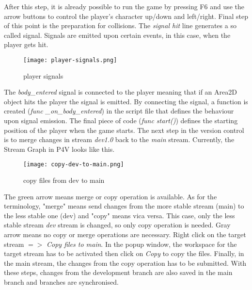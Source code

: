   After this step, it is already possible to run the game by pressing F6 and use the arrow buttons to control the player's
  character up/down and left/right.
  Final step of this point is the preparation for collisions. The \textit{signal hit} line generates a so called signal.
  Signals are emitted upon certain events, in this case, when the player gets hit.
  \begin{figure}[H]
    \centering
    \texttt{[image: player-signals.png]}
    \caption{player signals}
    \label{fig:player-signals}
  \end{figure}
  The \textit{body\_entered} signal is connected to the player meaning that if an Area2D object hits the player the signal
  is emitted. By connecting the signal, a function is created (\textit{func \_on\_body\_entered}) in the script file that defines the behaviour upon signal
  emission. The final piece of code (\textit{func start()}) defines the starting position of the player when the game starts.
The next step in the version control is to merge changes in stream \textit{dev1.0} back to the \textit{main} stream. Currently,
the Stream Graph in P4V looks like this.
\begin{figure}[H]
  \centering
  \texttt{[image: copy-dev-to-main.png]}
  \caption{copy files from dev to main}
  \label{fig:copy-dev-to-main}
\end{figure}
The green arrow means merge or copy operation is available. As for the terminology, "merge" means send changes from the 
more stable stream (main) to the less stable one (dev) and "copy" means vica versa. This case, only the less stable stream
\textit{dev} stream is changed, so only copy operation is needed. Gray arrow means no copy or merge operations are necessary.
Right click on the target stream {$=>$} \textit{Copy files to main}. In the popup window, the workspace for the target stream
has to be activated then click on \textit{Copy} to copy the files. Finally, in the main stream, the changes from the 
copy operation has to be submitted. With these steps, changes from the development branch are also saved in the main branch
and branches are synchronised.

